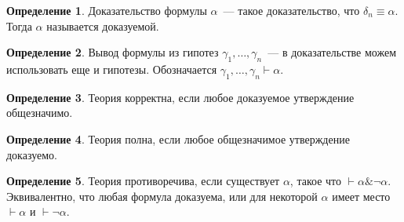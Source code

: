 \documentclass[a4paper,11pt]{article}
\theoremstyle{definition}
\newtheorem*{dfn}{Определение}
\newcommand{\proves}{\vdash}
\newcommand{\amp}{\mathbin{\&}}
\begin{document}
\begin{dfn}
Доказательство формулы $\alpha$~--- такое доказательство, что $\delta_n \equiv
\alpha$. Тогда $\alpha$ называется доказуемой.
\end{dfn}
\begin{dfn}
Вывод формулы из гипотез $\gamma_1, \dots, \gamma_n$~--- в доказательстве можем
использовать еще и гипотезы. Обозначается $\gamma_1, \dots, \gamma_n \proves
\alpha$.
\end{dfn}
\begin{dfn}
Теория корректна, если любое доказуемое утверждение общезначимо.
\end{dfn}
\begin{dfn}
Теория полна, если любое общезначимое утверждение доказуемо.
\end{dfn}
\begin{dfn}
Теория противоречива, если существует $\alpha$, такое что $\proves \alpha \amp
\neg\alpha$. Эквивалентно, что любая формула доказуема, или для некоторой
$\alpha$ имеет место $\proves \alpha$ и $\proves \neg\alpha$.
\end{dfn}
\end{document}

